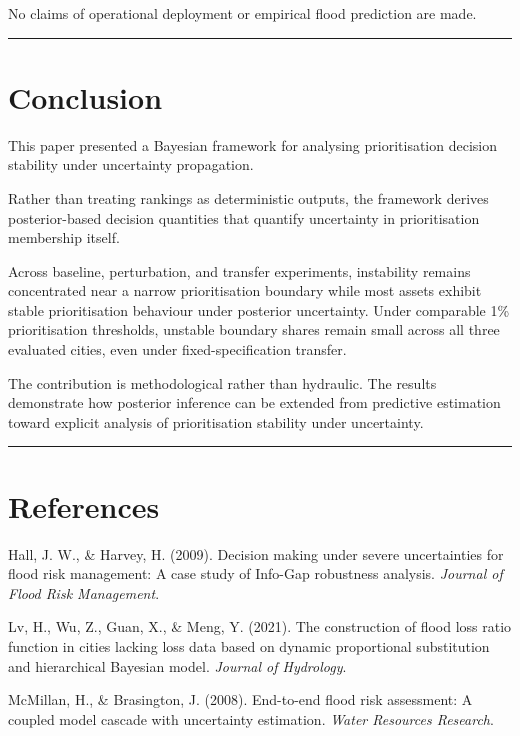 \documentclass[
]{article}
\begin{document}
No claims of operational deployment or empirical flood prediction are
made.

\begin{center}\rule{0.5\linewidth}{0.5pt}\end{center}

\section{Conclusion}\label{conclusion}

This paper presented a Bayesian framework for analysing prioritisation
decision stability under uncertainty propagation.

Rather than treating rankings as deterministic outputs, the framework
derives posterior-based decision quantities that quantify uncertainty in
prioritisation membership itself.

Across baseline, perturbation, and transfer experiments, instability
remains concentrated near a narrow prioritisation boundary while most
assets exhibit stable prioritisation behaviour under posterior
uncertainty. Under comparable 1\% prioritisation thresholds, unstable
boundary shares remain small across all three evaluated cities, even
under fixed-specification transfer.

The contribution is methodological rather than hydraulic. The results
demonstrate how posterior inference can be extended from predictive
estimation toward explicit analysis of prioritisation stability under
uncertainty.

\begin{center}\rule{0.5\linewidth}{0.5pt}\end{center}

\section{References}\label{references}

Hall, J. W., \& Harvey, H. (2009). Decision making under severe
uncertainties for flood risk management: A case study of Info-Gap
robustness analysis. \emph{Journal of Flood Risk Management}.

Lv, H., Wu, Z., Guan, X., \& Meng, Y. (2021). The construction of flood
loss ratio function in cities lacking loss data based on dynamic
proportional substitution and hierarchical Bayesian model. \emph{Journal
of Hydrology}.

McMillan, H., \& Brasington, J. (2008). End-to-end flood risk
assessment: A coupled model cascade with uncertainty estimation.
\emph{Water Resources Research}.
\end{document}
